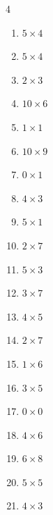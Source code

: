 \begin{multicols}{4}
\begin{enumerate}
  \item $5\times 4$
        \phantom{$=20$}

  \item $5\times 4$
        \phantom{$=20$}

  \item $2\times 3$
        \phantom{$=6$}

  \item $10\times 6$
        \phantom{$=60$}

  \item $1\times 1$
        \phantom{$=1$}

\columnbreak %

  \item $10\times 9$
        \phantom{$=90$}

  \item $0\times 1$
        \phantom{$=0$}

  \item $4\times 3$
        \phantom{$=12$}

  \item $5\times 1$
        \phantom{$=5$}

  \item $2\times 7$
        \phantom{$=14$}

  \item $5\times 3$
        \phantom{$=15$}

  \item $3\times 7$
        \phantom{$=21$}

  \item $4\times 5$
        \phantom{$=20$}

  \item $2\times 7$
        \phantom{$=14$}

  \item $1\times 6$
        \phantom{$=6$}

  \item $3\times 5$
        \phantom{$=15$}

  \item $0\times 0$
        \phantom{$=0$}

  \item $4\times 6$
        \phantom{$=24$}

  \item $6\times 8$
        \phantom{$=48$}

  \item $5\times 5$
        \phantom{$=25$}

  \item $4\times 3$
        \phantom{$=12$}


\end{enumerate}
\end{multicols}
